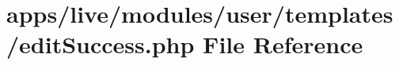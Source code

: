 \hypertarget{live_2modules_2user_2templates_2edit_success_8php}{\section{apps/live/modules/user/templates/edit\-Success.php File Reference}
\label{live_2modules_2user_2templates_2edit_success_8php}
}
